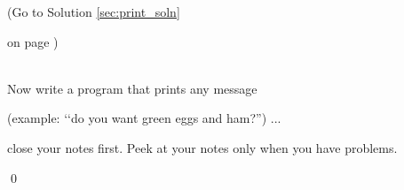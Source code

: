 \label{sec:print}

(Go to Solution \ref{sec:print_soln} 

on page \pageref{sec:print_soln}) 

\\

Now write a program that prints any message 

(example: \lq\lq do you want green eggs and ham?'') ... 

close your notes first. Peek at your notes only when you have problems.

\qed

